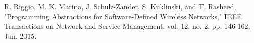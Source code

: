 \begin{thebibliography}{1}
 R. Riggio, M. K. Marina, J. Schulz-Zander, S. Kuklinski, and T. Rasheed, "Programming Abstractions for Software-Defined Wireless Networks," IEEE Transactions on Network and Service Management, vol. 12, no. 2, pp. 146-162, Jun. 2015.








%
%
%
%
%


\end{thebibliography}
